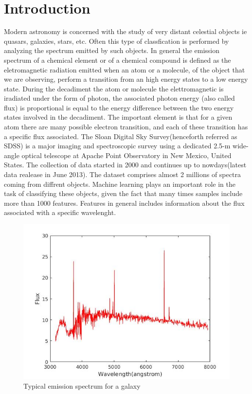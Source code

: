 \documentclass[a4paper,10pt]{article}
\begin{document}
\section{Introduction}
  Modern astronomy is concerned with the study of very distant celestial objects ie quasars, galaxies, stars, etc.\newline
  Often this type of classfication is performed by analyzing the spectrum emitted by such objects.\newline
  In general the emission spectrum of a chemical element or of a chemical compound is defined as the eletromagnetic radiation emitted
  when an atom or a molecule, of the object that we are observing, perform a transition from an high energy states to a low energy state.
  During the decadiment the atom or molecule the elettromagnetic is iradiated under the form of photon, the associated photon energy
  (also called flux) is proportional is equal to the energy difference between the two energy states involved in the decadiment.\newline
  The important element is that for a given atom there are many possible electron transition, and each of these transition has a specific
  flux associated.\newline
  The Sloan Digital Sky Survey(henceforth referred as SDSS) is a major imaging and spectroscopic survey using a dedicated 2.5-m wide-angle
  optical telescope at Apache Point Observatory in New Mexico, United States.\newline
  The collection of data started in 2000 and continues up to nowdays(latest data realease in June 2013). The dataset comprises almost
  2 millions of spectra coming from diffrent objects.\newline
  Machine learning plays an important role in the task of classifying these objects, given the fact that many times samples include
  more than 1000 features.\newline
  Features in general includes information about the flux associated with a specific wavelenght.
  \begin{figure}[!ht]
    \caption{Typical emission spectrum for a galaxy}
    \centering
    \includegraphics[scale=0.55]{emission_galaxy.jpg}
  \end{figure}
  
\end{document}
